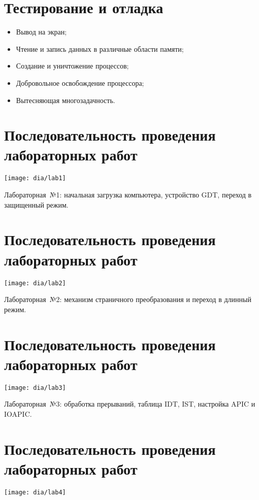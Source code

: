 \documentclass[12pt]{article}
\begin{document}
\section{\textbf{Тестирование и отладка}}
\begin{itemize}
\item Вывод на экран;
\item Чтение и запись данных в различные области памяти;
\item Создание и уничтожение процессов;
\item Добровольное освобождение процессора;
\item Вытесняющая многозадачность.
\end{itemize}


\section{\textbf{Последовательность проведения лабораторных работ}}
\begin{center}
\texttt{[image: dia/lab1]}
\end{center}

Лабораторная~№1: начальная загрузка компьютера, устройство GDT, переход в защищенный режим.


\section{\textbf{Последовательность проведения лабораторных работ}}
\begin{center}
\texttt{[image: dia/lab2]}
\end{center}

Лабораторная~№2: механизм страничного преобразования и переход в длинный режим.

\section{\textbf{Последовательность проведения лабораторных работ}}
\begin{center}
\texttt{[image: dia/lab3]}
\end{center}

Лабораторная~№3: обработка прерываний, таблица IDT, IST, настройка APIC и IOAPIC.

\section{\textbf{Последовательность проведения лабораторных работ}}
\begin{center}
\texttt{[image: dia/lab4]}
\end{center}
\end{document}
